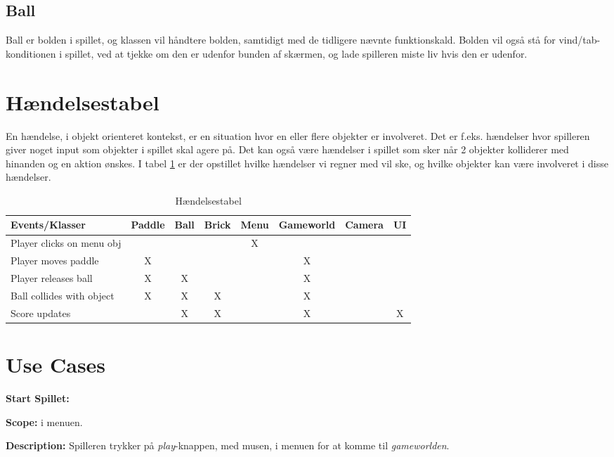 \subsection{Ball}
Ball er bolden i spillet, og klassen vil håndtere bolden, samtidigt med de tidligere nævnte funktionskald. Bolden vil også stå for
vind/tab-konditionen i spillet, ved at tjekke om den er udenfor bunden af skærmen, og lade spilleren miste liv hvis den er udenfor.


\section{Hændelsestabel}
En hændelse, i objekt orienteret kontekst, er en situation hvor en eller flere objekter er involveret. Det er f.eks. hændelser hvor spilleren giver noget input som objekter i spillet skal agere på. Det kan også være hændelser i spillet som sker når 2 objekter kolliderer med hinanden og en aktion ønskes. I tabel \ref{eventtabel} er der opstillet hvilke hændelser vi regner med vil ske, og hvilke objekter kan være involveret i disse hændelser.
\begin{table}[]
\centering
\caption{Hændelsestabel}
\label{eventtabel}
\begin{tabular}{|l|c|c|c|c|c|c|c|}
\hline
Events/Klasser & Paddle & Ball & Brick & Menu & Gameworld & Camera & UI \\ \hline
Player clicks on menu obj &  &  &  & X &  &  &  \\ \hline
Player moves paddle & X &  &  &  & X &  &  \\ \hline
Player releases ball & X & X &  &  & X &  &  \\ \hline
Ball collides with object & X & X & X &  & X &  &  \\ \hline
Score updates &  & X & X &  & X &  & X \\ \hline
\end{tabular}
\end{table}

\section{Use Cases}

\textbf{Start Spillet:}\newline

\textbf{Scope:}\newline
i menuen.\newline

\textbf{Description:} \newline
Spilleren trykker på \textit{play}-knappen, med musen, i menuen for at komme til \textit{gameworlden}. \newline

